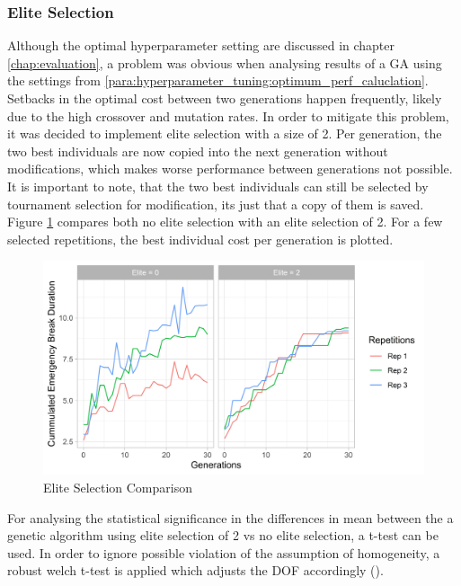 \subsubsection{Elite Selection}
Although the optimal hyperparameter setting are discussed in chapter \ref{chap:evaluation}, a problem was obvious when analysing results of a GA using the settings from \ref{para:hyperparameter_tuning:optimum_perf_caluclation}. Setbacks in the optimal cost between two generations happen frequently, likely due to the high crossover and mutation rates. In order to mitigate this problem, it was decided to implement elite selection with a size of 2. Per generation, the two best individuals are now copied into the next generation without modifications, which makes worse performance between generations not possible. It is important to note, that the two best individuals can still be selected by tournament selection for modification, its just that a copy of them is saved. Figure \ref{figure:elite_no_elite_comp} compares both no elite selection with an elite selection of 2. For a few selected repetitions, the best individual cost per generation is plotted.

\begin{figure}[ht] 
	\label{figure:elite_no_elite_comp}
	\includegraphics[width=1\linewidth]{simulations/evaluation/plots/elite_vs_no_elite_generations}
	\caption{Elite Selection Comparison}
\end{figure}

For analysing the statistical significance in the differences in mean between the a genetic algorithm using elite selection of 2 vs no elite selection, a t-test can be used. In order to ignore possible violation of the assumption of homogeneity, a robust welch t-test is applied which adjusts the DOF accordingly (\cite{field_discovering_2012}).

